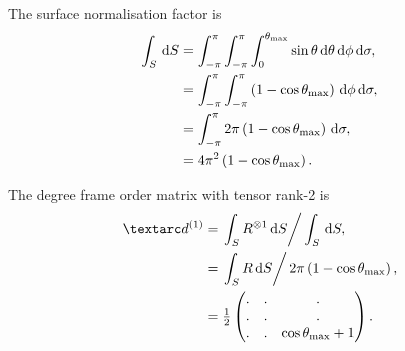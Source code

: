 The surface normalisation factor is
\begin{subequations}
\begin{align}
    \int_S \,\mathrm{d} S &= \int_{-\pi}^{\pi} \int_{-\pi}^{\pi} \int_{0}^{\theta_\textrm{max}} \sin\theta \,\mathrm{d}\theta \,\mathrm{d}\phi \,\mathrm{d}\sigma , \\
                   &= \int_{-\pi}^{\pi} \int_{-\pi}^{\pi} \left( 1 - \cos\theta_\textrm{max} \right) \,\mathrm{d}\phi \,\mathrm{d}\sigma , \\
                   &= \int_{-\pi}^{\pi} 2\pi \left( 1 - \cos\theta_\textrm{max} \right) \,\mathrm{d}\sigma , \\
                   &= 4\pi^2 \left( 1 - \cos\theta_\textrm{max} \right) .
\end{align}
\end{subequations}



The  degree frame order matrix with tensor rank-2 is
\begin{subequations} \label{eq: iso cone, free rotor 1st degree frame order matrix}
\begin{align}
    \FOone &= \left. \int_S R^{\otimes 1} \diff S \right / \int_S \diff S , \\
           &= \left. \int_S R \diff S \right / 2\pi \left( 1 - \cos\conethetamax \right) , \\
           &= \half \begin{pmatrix}
                  . & . & . \\
                  . & . & . \\
                  . & . & \cos\conethetamax + 1 \\
              \end{pmatrix} .
\end{align}
\end{subequations}




